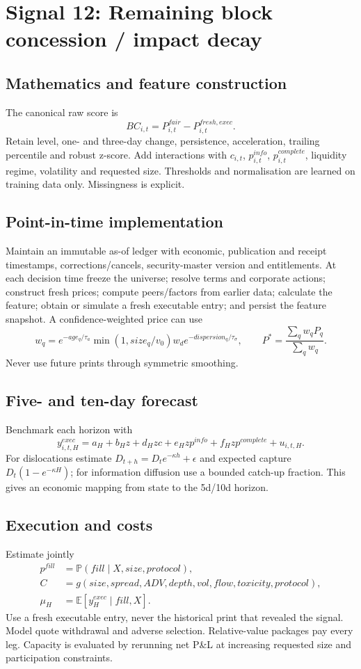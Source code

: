 \documentclass[10pt]{article}
\newcommand{\E}{\mathbb{E}}\newcommand{\Pp}{\mathbb{P}}
\begin{document}
\section{Signal 12: Remaining block concession / impact decay}
\subsection{Mathematics and feature construction}
The canonical raw score is
\begin{equation}BC_{i,t}=P^{fair}_{i,t}-P^{fresh,exec}_{i,t}.\end{equation}
Retain level, one- and three-day change, persistence, acceleration, trailing percentile and robust z-score. Add interactions with $c_{i,t}$, $p^{info}_{i,t}$, $p^{complete}_{i,t}$, liquidity regime, volatility and requested size. Thresholds and normalisation are learned on training data only. Missingness is explicit.

\subsection{Point-in-time implementation}
Maintain an immutable as-of ledger with economic, publication and receipt timestamps, corrections/cancels, security-master version and entitlements. At each decision time freeze the universe; resolve terms and corporate actions; construct fresh prices; compute peers/factors from earlier data; calculate the feature; obtain or simulate a fresh executable entry; and persist the feature snapshot. A confidence-weighted price can use
\[w_q=e^{-age_q/\tau_a}\min(1,size_q/v_0)w_d e^{-dispersion_q/\tau_\sigma},\qquad P^*=\frac{\sum_qw_qP_q}{\sum_qw_q}.\]
Never use future prints through symmetric smoothing.

\subsection{Five- and ten-day forecast}
Benchmark each horizon with
\[y^{exec}_{i,t,H}=a_H+b_Hz+d_Hzc+e_Hzp^{info}+f_Hzp^{complete}+u_{i,t,H}.\]
For dislocations estimate $D_{t+h}=D_te^{-\kappa h}+\epsilon$ and expected capture $D_t(1-e^{-\kappa H})$; for information diffusion use a bounded catch-up fraction. This gives an economic mapping from state to the 5d/10d horizon.

\subsection{Execution and costs}
Estimate jointly
\begin{align}
p^{fill}&=\Pp(fill\mid X,size,protocol),\\
C&=g(size,spread,ADV,depth,vol,flow,toxicity,protocol),\\
\mu_H&=\E[y^{exec}_H\mid fill,X].
\end{align}
Use a fresh executable entry, never the historical print that revealed the signal. Model quote withdrawal and adverse selection. Relative-value packages pay every leg. Capacity is evaluated by rerunning net P\&L at increasing requested size and participation constraints.
\end{document}
